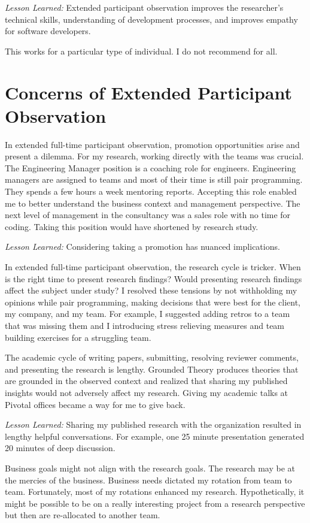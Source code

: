 \textit{Lesson Learned:} Extended participant observation improves the researcher's technical skills, understanding of development processes, and improves empathy for software developers.


This works for a particular type of individual. I do not recommend for all.


\section{Concerns of Extended Participant Observation}
In extended full-time participant observation, promotion opportunities arise and present a dilemma. For my research, working directly with the teams was crucial. The Engineering Manager position is a coaching role for engineers. Engineering managers are assigned to teams and most of their time is still pair programming. They spends a few hours a week mentoring reports. Accepting this role enabled me to better understand the business context and management perspective. The next level of management in the consultancy was a sales role with no time for coding. Taking this position would have shortened by research study. 

\textit{Lesson Learned:} Considering taking a promotion has nuanced implications. 

In extended full-time participant observation, the research cycle is tricker. When is the right time to present research findings? Would presenting research findings affect the subject under study? I resolved these tensions by not withholding my opinions while pair programming, making decisions that were best for the client, my company, and my team. For example, I suggested adding retros to a team that was missing them and I introducing stress relieving measures and team building exercises for a struggling team.

The academic cycle of writing papers, submitting, resolving reviewer comments, and presenting the research is lengthy. Grounded Theory produces theories that are grounded in the observed context and realized that sharing my published insights would not adversely affect my research. Giving my academic talks at Pivotal offices became a way for me to give back. 

\textit{Lesson Learned:} Sharing my published research with the organization resulted in lengthy helpful conversations. For example, one 25 minute presentation generated 20 minutes of deep discussion.

Business goals might not align with the research goals. The research may be at the mercies of the business. Business needs dictated my rotation from team to team. Fortunately, most of my rotations enhanced my research. Hypothetically, it might be possible to be on a really interesting project from a research perspective but then are re-allocated to another team. 

